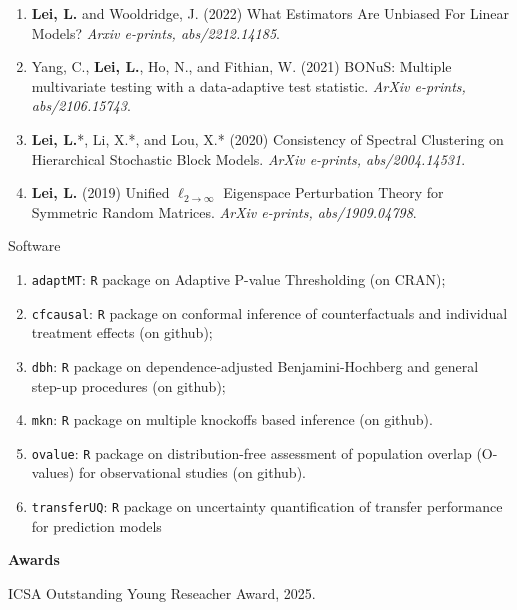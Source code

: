 \documentclass{article}
\begin{document}
\begin{enumerate}
\item \textbf{Lei, L.} and Wooldridge, J. (2022) What Estimators Are Unbiased For Linear Models? \emph{Arxiv e-prints, abs/2212.14185}.
\item Yang, C., \textbf{Lei, L.}, Ho, N., and Fithian, W. (2021) BONuS: Multiple multivariate testing with a data-adaptive test statistic. \emph{ArXiv e-prints, abs/2106.15743}.
\item \textbf{Lei, L.}*, Li, X.*, and Lou, X.* (2020) Consistency of Spectral Clustering on Hierarchical Stochastic Block Models. \emph{ArXiv e-prints, abs/2004.14531}.
\item \textbf{Lei, L.} (2019) Unified $\ell_{2\rightarrow\infty}$ Eigenspace Perturbation Theory for Symmetric Random Matrices. \emph{ArXiv e-prints, abs/1909.04798}.
\end{enumerate}

\begin{large}
\noindent Software
\end{large}

\begin{enumerate}
\item \texttt{adaptMT}: \texttt{R} package on Adaptive P-value Thresholding (on CRAN);
\item \texttt{cfcausal}: \texttt{R} package on conformal inference of counterfactuals and individual treatment effects (on github);
\item \texttt{dbh}: \texttt{R} package on dependence-adjusted Benjamini-Hochberg and general step-up procedures (on github);
\item \texttt{mkn}: \texttt{R} package on multiple knockoffs based inference (on github).
\item \texttt{ovalue}: \texttt{R} package on distribution-free assessment of population overlap (O-values) for observational studies (on github).
\item \texttt{transferUQ}: \texttt{R} package on uncertainty quantification of transfer performance for prediction models
\end{enumerate}

\vspace{3mm}
\begin{large}
\noindent \textbf{Awards}
\end{large}

\vspace{5mm}

ICSA Outstanding Young Reseacher Award, 2025.

\vspace{2mm}
\end{document}
